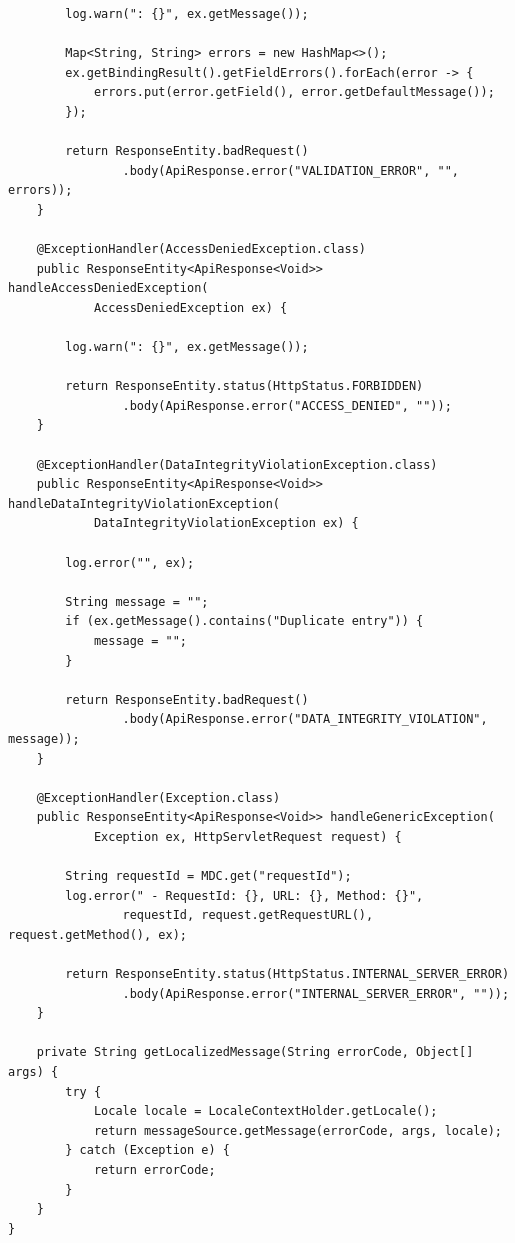 \begin{verbatim}
        log.warn(": {}", ex.getMessage());
        
        Map<String, String> errors = new HashMap<>();
        ex.getBindingResult().getFieldErrors().forEach(error -> {
            errors.put(error.getField(), error.getDefaultMessage());
        });
        
        return ResponseEntity.badRequest()
                .body(ApiResponse.error("VALIDATION_ERROR", "", errors));
    }
    
    @ExceptionHandler(AccessDeniedException.class)
    public ResponseEntity<ApiResponse<Void>> handleAccessDeniedException(
            AccessDeniedException ex) {
        
        log.warn(": {}", ex.getMessage());
        
        return ResponseEntity.status(HttpStatus.FORBIDDEN)
                .body(ApiResponse.error("ACCESS_DENIED", ""));
    }
    
    @ExceptionHandler(DataIntegrityViolationException.class)
    public ResponseEntity<ApiResponse<Void>> handleDataIntegrityViolationException(
            DataIntegrityViolationException ex) {
        
        log.error("", ex);
        
        String message = "";
        if (ex.getMessage().contains("Duplicate entry")) {
            message = "";
        }
        
        return ResponseEntity.badRequest()
                .body(ApiResponse.error("DATA_INTEGRITY_VIOLATION", message));
    }
    
    @ExceptionHandler(Exception.class)
    public ResponseEntity<ApiResponse<Void>> handleGenericException(
            Exception ex, HttpServletRequest request) {
        
        String requestId = MDC.get("requestId");
        log.error(" - RequestId: {}, URL: {}, Method: {}", 
                requestId, request.getRequestURL(), request.getMethod(), ex);
        
        return ResponseEntity.status(HttpStatus.INTERNAL_SERVER_ERROR)
                .body(ApiResponse.error("INTERNAL_SERVER_ERROR", ""));
    }
    
    private String getLocalizedMessage(String errorCode, Object[] args) {
        try {
            Locale locale = LocaleContextHolder.getLocale();
            return messageSource.getMessage(errorCode, args, locale);
        } catch (Exception e) {
            return errorCode;
        }
    }
}


\end{verbatim}
